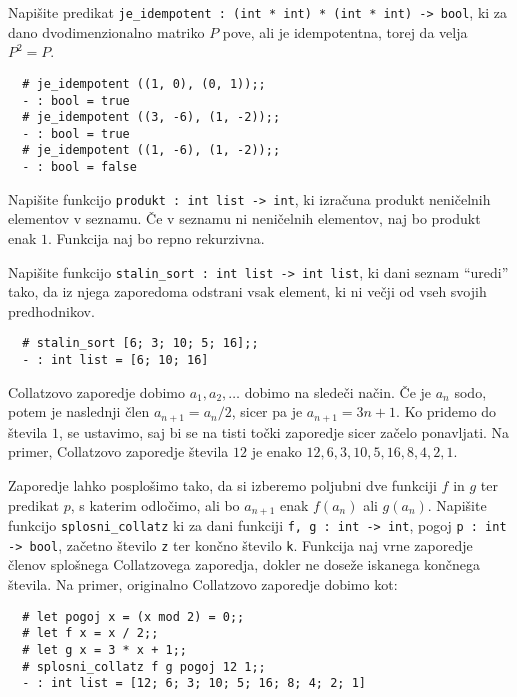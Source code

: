\documentclass[arhiv]{../izpit}
\begin{document}
	


\naloga

\podnaloga
Napišite predikat \verb|je_idempotent : (int * int) * (int * int) -> bool|,
ki za dano dvodimenzionalno matriko $P$ pove, ali je idempotentna, torej
da velja $P^2 = P$.

\begin{verbatim}
  # je_idempotent ((1, 0), (0, 1));;
  - : bool = true
  # je_idempotent ((3, -6), (1, -2));;
  - : bool = true
  # je_idempotent ((1, -6), (1, -2));;
  - : bool = false
\end{verbatim}
  
\podnaloga
Napišite funkcijo \verb|produkt : int list -> int|, ki izračuna produkt neničelnih
elementov v seznamu. Če v seznamu ni neničelnih elementov, naj bo produkt enak $1$.
Funkcija naj bo repno rekurzivna.
  
\podnaloga
Napišite funkcijo \verb|stalin_sort : int list -> int list|, ki dani seznam ``uredi'' tako,
da iz njega zaporedoma odstrani vsak element, ki ni večji od vseh svojih predhodnikov.

\begin{verbatim}
  # stalin_sort [6; 3; 10; 5; 16];;
  - : int list = [6; 10; 16]
\end{verbatim}

\podnaloga
Collatzovo zaporedje dobimo $a_1, a_2, \dots$ dobimo na sledeči način. Če je $a_n$ sodo, potem je naslednji člen $a_{n + 1} = a_n / 2$, sicer pa je $a_{n + 1} = 3 n + 1$. Ko pridemo do števila $1$, se ustavimo, saj bi se na tisti točki zaporedje sicer začelo ponavljati. Na primer, Collatzovo zaporedje števila $12$ je enako $12, 6, 3, 10, 5, 16, 8, 4, 2, 1$. 

Zaporedje lahko posplošimo tako, da si izberemo poljubni dve funkciji $f$ in $g$ ter predikat $p$, s katerim odločimo, ali bo $a_{n + 1}$ enak $f(a_n)$ ali $g(a_n)$. Napišite funkcijo \verb|splosni_collatz| ki za dani funkciji \verb|f, g : int -> int|, pogoj \verb|p : int -> bool|, začetno število \verb|z| ter končno število \verb|k|. Funkcija naj vrne zaporedje členov splošnega Collatzovega zaporedja, dokler ne doseže iskanega končnega števila. Na primer, originalno Collatzovo zaporedje dobimo kot:

\begin{verbatim}
  # let pogoj x = (x mod 2) = 0;;
  # let f x = x / 2;;
  # let g x = 3 * x + 1;;
  # splosni_collatz f g pogoj 12 1;;
  - : int list = [12; 6; 3; 10; 5; 16; 8; 4; 2; 1]
\end{verbatim}
\end{document}
